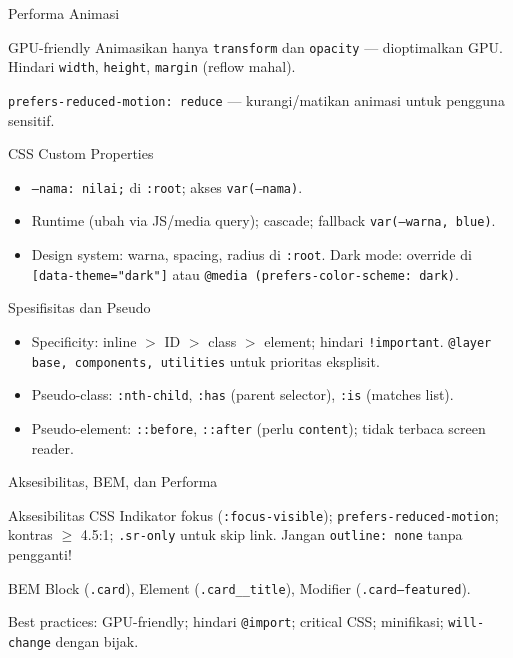 \documentclass[handout]{beamer}
\begin{document}
\begin{frame}{Performa Animasi}
	\begin{block}{GPU-friendly}
		Animasikan hanya \texttt{transform} dan \texttt{opacity} --- dioptimalkan GPU. Hindari \texttt{width}, \texttt{height}, \texttt{margin} (reflow mahal).
	\end{block}
	\texttt{prefers-reduced-motion: reduce} --- kurangi/matikan animasi untuk pengguna sensitif.
\end{frame}

\begin{frame}{CSS Custom Properties}
	\begin{itemize}
		\item \texttt{--nama: nilai;} di \texttt{:root}; akses \texttt{var(--nama)}.
		\item Runtime (ubah via JS/media query); cascade; fallback \texttt{var(--warna, blue)}.
		\item Design system: warna, spacing, radius di \texttt{:root}. Dark mode: override di \texttt{[data-theme="dark"]} atau \texttt{@media (prefers-color-scheme: dark)}.
	\end{itemize}
\end{frame}

\begin{frame}{Spesifisitas dan Pseudo}
	\begin{itemize}
		\item Specificity: inline $>$ ID $>$ class $>$ element; hindari \texttt{!important}. \texttt{@layer base, components, utilities} untuk prioritas eksplisit.
		\item Pseudo-class: \texttt{:nth-child}, \texttt{:has} (parent selector), \texttt{:is} (matches list).
		\item Pseudo-element: \texttt{::before}, \texttt{::after} (perlu \texttt{content}); tidak terbaca screen reader.
	\end{itemize}
\end{frame}

\begin{frame}{Aksesibilitas, BEM, dan Performa}
	\begin{block}{Aksesibilitas CSS}
		Indikator fokus (\texttt{:focus-visible}); \texttt{prefers-reduced-motion}; kontras $\geq$ 4.5:1; \texttt{.sr-only} untuk skip link. Jangan \texttt{outline: none} tanpa pengganti!
	\end{block}
	\begin{block}{BEM}
		Block (\texttt{.card}), Element (\texttt{.card\_\_title}), Modifier (\texttt{.card--featured}).
	\end{block}
	Best practices: GPU-friendly; hindari \texttt{@import}; critical CSS; minifikasi; \texttt{will-change} dengan bijak.
\end{frame}
\end{document}
